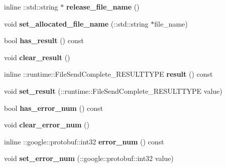 \begin{DoxyCompactItemize}
inline \+::std\+::string $\ast$ {\bfseries release\+\_\+file\+\_\+name} ()
\item 
\mbox{\label{classruntime_1_1FileSendComplete_abbaaf44da1814e6bdf38ee7b346a02ff}} 
void {\bfseries set\+\_\+allocated\+\_\+file\+\_\+name} (\+::std\+::string $\ast$file\+\_\+name)
\item 
\mbox{\label{classruntime_1_1FileSendComplete_a66ad9cf6e8689bb2825f8a00410315af}} 
bool {\bfseries has\+\_\+result} () const
\item 
\mbox{\label{classruntime_1_1FileSendComplete_a4d9977eef85aaafa664b2a9cb78c7826}} 
void {\bfseries clear\+\_\+result} ()
\item 
\mbox{\label{classruntime_1_1FileSendComplete_a388fdbd24dc76f5d47a41078c758f767}} 
inline \+::runtime\+::\+File\+Send\+Complete\+\_\+\+R\+E\+S\+U\+L\+T\+T\+Y\+PE {\bfseries result} () const
\item 
\mbox{\label{classruntime_1_1FileSendComplete_a2e5624714c948f022e18e8ba82adcb49}} 
void {\bfseries set\+\_\+result} (\+::runtime\+::\+File\+Send\+Complete\+\_\+\+R\+E\+S\+U\+L\+T\+T\+Y\+PE value)
\item 
\mbox{\label{classruntime_1_1FileSendComplete_a61dfd7b49b2e7362e7d171765d2847c0}} 
bool {\bfseries has\+\_\+error\+\_\+num} () const
\item 
\mbox{\label{classruntime_1_1FileSendComplete_a8b7a9816993560c929e53e1eacf8cf4d}} 
void {\bfseries clear\+\_\+error\+\_\+num} ()
\item 
\mbox{\label{classruntime_1_1FileSendComplete_a0946f11925412336970226f271952c40}} 
inline \+::google\+::protobuf\+::int32 {\bfseries error\+\_\+num} () const
\item 
\mbox{\label{classruntime_1_1FileSendComplete_a95e3393fd9db38e948231acc60650b1e}} 
void {\bfseries set\+\_\+error\+\_\+num} (\+::google\+::protobuf\+::int32 value)
\end{DoxyCompactItemize}
